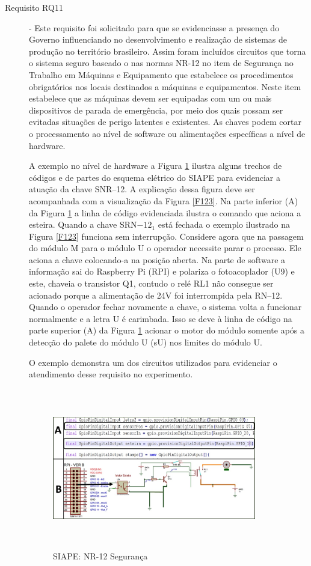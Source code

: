 \documentclass[10pt,letterpaper,twocolumn]{IEEEtran}
\begin{document}
\begin{description}
	\item[Requisito RQ11] - Este requisito foi solicitado para que se evidenciasse a presença do Governo influenciando no desenvolvimento e realização de sistemas de produção no território brasileiro. Assim foram incluídos circuitos que torna o sistema seguro baseado o nas normas NR-12 no item de Segurança no Trabalho em Máquinas e Equipamento que estabelece os procedimentos obrigatórios nos locais destinados a máquinas e equipamentos. Neste item estabelece que as máquinas devem ser equipadas com um ou mais dispositivos de parada de emergência, por meio dos quais possam ser evitadas situações de perigo latentes e existentes. As chaves podem cortar o processamento ao nível de software ou alimentações específicas a nível de hardware. \par 
	A exemplo no nível de hardware a Figura \ref{F128} ilustra alguns trechos de códigos e de partes do esquema elétrico do SIAPE para evidenciar  a atuação da chave SNR--12. A explicação dessa figura deve ser acompanhada com a visualização da Figura \ref{F123}. Na parte inferior (A) da Figura \ref{F128}  a linha de código evidenciada ilustra o comando que aciona a esteira. Quando a chave SRN$-12_1$ está fechada o exemplo ilustrado na Figura \ref{F123} funciona sem interrupção. Considere agora que na passagem do módulo M para o módulo U o operador necessite parar o processo. Ele aciona a chave colocando-a na posição aberta. Na parte de software a informação sai do Raspberry Pi (RPI) e polariza o fotoacoplador (U9) e este, chaveia o transistor Q1, contudo o relé RL1 não consegue ser acionado porque a alimentação de 24V foi interrompida pela RN--12. Quando o operador fechar novamente a chave, o sistema volta a funcionar normalmente e a letra U é carimbada. Isso se deve à linha de código na parte superior (A) da Figura \ref{F128} acionar o motor do módulo somente após a detecção do palete do módulo U (sU) nos limites do módulo U.\par 
	O exemplo demonstra um dos circuitos utilizados para evidenciar o atendimento desse requisito no experimento. 
	
	
	\begin{figure}[h]
		\centering
		\includegraphics[width=8.9cm, height=7cm]{MeDSE_imagens/F128_SIAPE_SEGURANCA.jpg} 
		\caption{SIAPE: NR-12 Segurança}
		\label{F128}
	\end{figure}	
	

\end{description}
\end{document}
